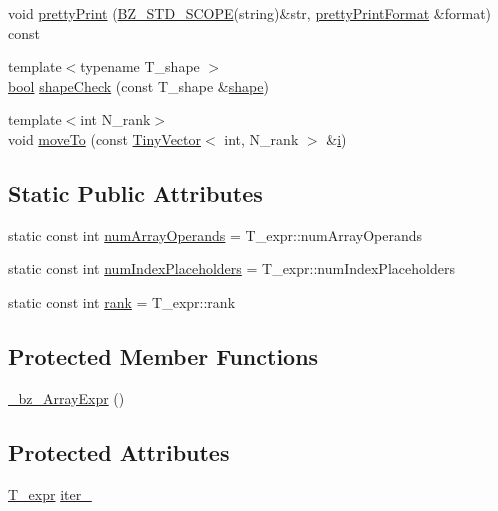 \begin{DoxyCompactItemize}
\item 
void \hyperlink{class__bz__ArrayExpr_a357221b0b8d1a7fa2de08c1cc20d1d86}{pretty\+Print} (\hyperlink{numinquire_8h_a2b24ffc3b4ef9803956bc7715c6c7b83}{B\+Z\+\_\+\+S\+T\+D\+\_\+\+S\+C\+O\+P\+E}(string)\&str, \hyperlink{classprettyPrintFormat}{pretty\+Print\+Format} \&format) const 
\item 
{\footnotesize template$<$typename T\+\_\+shape $>$ }\\\hyperlink{compiler_8h_abb452686968e48b67397da5f97445f5b}{bool} \hyperlink{class__bz__ArrayExpr_adc41d3db39dc57d5b2e8abd4e919d98a}{shape\+Check} (const T\+\_\+shape \&\hyperlink{shape_8h_a9d9da3dcaecbbde6cf1961063f2e838b}{shape})
\item 
{\footnotesize template$<$int N\+\_\+rank$>$ }\\void \hyperlink{class__bz__ArrayExpr_aa3cf70a9a304333aa7fba96b57f170f7}{move\+To} (const \hyperlink{classTinyVector}{Tiny\+Vector}$<$ int, N\+\_\+rank $>$ \&\hyperlink{indexexpr_8h_aabd77643995707c185e95c8cb2782c81}{i})
\end{DoxyCompactItemize}
\subsection*{Static Public Attributes}
\begin{DoxyCompactItemize}
\item 
static const int \hyperlink{class__bz__ArrayExpr_a592183de972c5d094677ce767b0ca68b}{num\+Array\+Operands} = T\+\_\+expr\+::num\+Array\+Operands
\item 
static const int \hyperlink{class__bz__ArrayExpr_abbc27ae7cbbf90b7509c5c66a3e94ce6}{num\+Index\+Placeholders} = T\+\_\+expr\+::num\+Index\+Placeholders
\item 
static const int \hyperlink{class__bz__ArrayExpr_aba2f516b84f2a7a0c04e0d01dbba3fd3}{rank} = T\+\_\+expr\+::rank
\end{DoxyCompactItemize}
\subsection*{Protected Member Functions}
\begin{DoxyCompactItemize}
\item 
\hyperlink{class__bz__ArrayExpr_a14668361c58739329e58c08b196e784c}{\+\_\+bz\+\_\+\+Array\+Expr} ()
\end{DoxyCompactItemize}
\subsection*{Protected Attributes}
\begin{DoxyCompactItemize}
\item 
\hyperlink{class__bz__ArrayExpr_a1675ef17c504a89b9bc1e8ddf4e875c2}{T\+\_\+expr} \hyperlink{class__bz__ArrayExpr_aa333bbbf4062d39da6466cef8330d5b5}{iter\+\_\+}
\end{DoxyCompactItemize}


